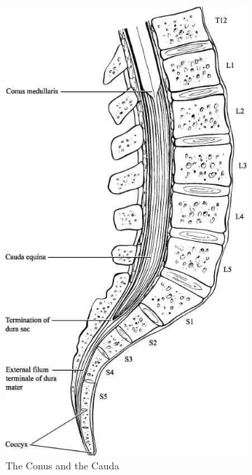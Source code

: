 \documentclass[
  12pt,
]{memoir}
\begin{document}
\begin{figure}[h!]
    \begin{subfigure}[b]{.4\textwidth}
        \includegraphics[width=\textwidth]{../assets/med/cauda.jpg}
        \vspace*{10mm}
        \caption{The Conus and the Cauda}
    \end{subfigure}\hfill
    \begin{subfigure}[b]{.4\textwidth}

\end{subfigure}
\end{figure}
\end{document}
